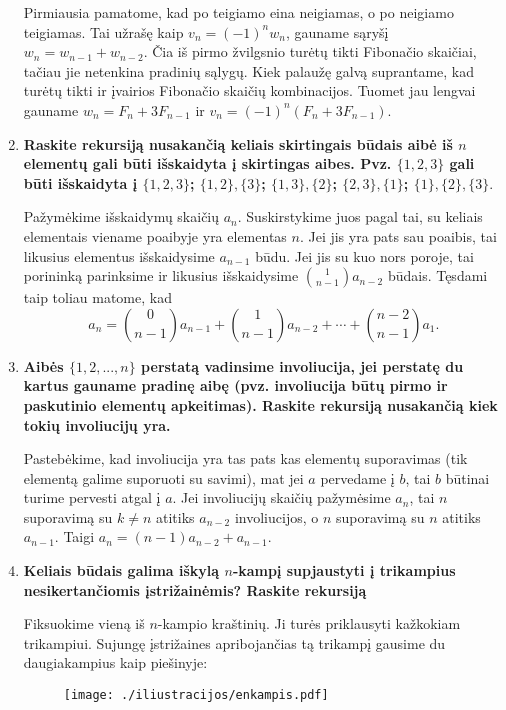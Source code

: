 \begin{enumerate}
Pirmiausia pamatome, kad po teigiamo eina neigiamas, o po neigiamo teigiamas. Tai užrašę kaip $v_n = (-1)^nw_n$, gauname sąryšį $w_n = w_{n-1} + w_{n-2}.$ Čia iš pirmo žvilgsnio turėtų tikti Fibonačio skaičiai, tačiau jie netenkina pradinių sąlygų. Kiek palaužę galvą suprantame, kad turėtų tikti ir įvairios Fibonačio skaičių kombinacijos. Tuomet jau lengvai gauname $w_n = F_{n} + 3F_{n-1}$ ir $v_n = (-1)^n(F_{n} + 3F_{n-1}).$ \medskip
    
\item {\bf Raskite rekursiją nusakančią keliais skirtingais būdais aibė iš $n$ elementų gali būti išskaidyta į skirtingas aibes. Pvz. $\{1,2,3\}$ gali būti išskaidyta į $\{1,2,3\}$; \hspace{0.2cm} $\{1,2\},\{3\}$;\hspace{0.2cm} $\{1,3\},\{2\}$;\hspace{0.2cm} $\{2,3\},\{1\}$;\hspace{0.2cm} $\{1\},\{2\},\{3\}.$}

Pažymėkime išskaidymų skaičių $a_n$. Suskirstykime juos pagal tai, su keliais elementais viename poaibyje yra elementas $n$. Jei jis yra pats sau poaibis, tai likusius elementus išskaidysime $a_{n-1}$ būdu. Jei jis su kuo nors poroje, tai porininką parinksime ir likusius išskaidysime $\binom{1}{n-1}a_{n-2}$ būdais. Tęsdami taip toliau matome, kad $$a_n = \binom{0}{n-1}a_{n-1} + \binom{1}{n-1}a_{n-2}+ \cdots + \binom{n-2}{n-1}a_{1}.$$\medskip  
  
\item {\bf Aibės $\{1,2,...,n\}$ perstatą vadinsime involiucija, jei perstatę du kartus gauname pradinę aibę (pvz. involiucija būtų pirmo ir paskutinio elementų apkeitimas). Raskite rekursiją nusakančią kiek tokių involiucijų yra.}

Pastebėkime, kad involiucija yra tas pats kas elementų suporavimas (tik elementą galime suporuoti su savimi), mat jei $a$ pervedame į $b$, tai $b$ būtinai turime pervesti atgal į $a$. Jei involiucijų skaičių pažymėsime $a_n$, tai $n$ suporavimą su $k\neq n$ atitiks $a_{n-2}$ involiucijos, o $n$ suporavimą su $n$ atitiks $a_{n-1}$. Taigi $a_n = (n-1)a_{n-2} + a_{n-1}.$  \medskip

\item {\bf Keliais būdais galima iškylą $n$-kampį supjaustyti į trikampius nesikertančiomis įstrižainėmis? Raskite rekursiją}

Fiksuokime vieną iš $n$-kampio kraštinių. Ji turės priklausyti kažkokiam trikampiui. Sujungę įstrižaines apribojančias tą trikampį gausime du daugiakampius kaip piešinyje:
\begin{figure}[h]
\centering\texttt{[image: ./iliustracijos/enkampis.pdf]}
\end{figure}


\end{enumerate}
